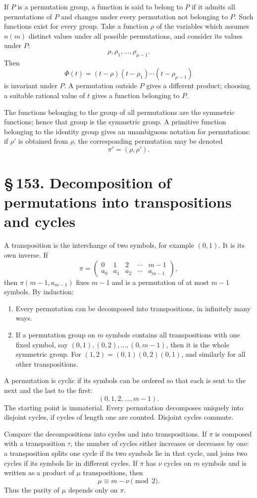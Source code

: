 \documentclass[11pt]{article}
\providecommand{\sect}[2]{\section*{\S\,#1. #2}}
\providecommand{\perm}[2]{\begin{pmatrix}#1\\#2\end{pmatrix}}
\begin{document}
If $P$ is a permutation group, a function is said to belong to $P$ if it admits all permutations of $P$ and changes under every permutation not belonging to $P$. Such functions exist for every group. Take a function $\rho$ of the variables which assumes $n(m)$ distinct values under all possible permutations, and consider its values under $P$:
\[
        \rho,
\rho_1,
\ldots,
\rho_{
\mu-1}.
\tag{1}
\]
Then
\[
        \Phi(t)=(t-\rho)(t-\rho_1)\cdots(t-\rho_{
\mu-1})
\tag{2}
\]
is invariant under $P$. A permutation outside $P$ gives a different product; choosing a suitable rational value of $t$ gives a function belonging to $P$.

The functions belonging to the group of all permutations are the symmetric functions; hence that group is the symmetric group. A primitive function belonging to the identity group gives an unambiguous notation for permutations: if $\rho'$ is obtained from $\rho$, the corresponding permutation may be denoted
\[
        \pi'=(\rho,\rho').
\]

\sect{153}{Decomposition of permutations into transpositions and cycles}

A transposition is the interchange of two symbols, for example $(0,1)$. It is its own inverse. If
\[
        \pi=\perm{0&1&2&\cdots&m-1}{a_0&a_1&a_2&\cdots&a_{m-1}},
\]
then $\pi(m-1,a_{m-1})$ fixes $m-1$ and is a permutation of at most $m-1$ symbols. By induction:

\begin{enumerate}[label=\arabic*.,leftmargin=2em]
\item Every permutation can be decomposed into transpositions, in infinitely many ways.
\item If a permutation group on $m$ symbols contains all transpositions with one fixed symbol, say $(0,1),(0,2),\ldots,(0,m-1)$, then it is the whole symmetric group. For $(1,2)=(0,1)(0,2)(0,1)$, and similarly for all other transpositions.
\end{enumerate}

A permutation is cyclic if its symbols can be ordered so that each is sent to the next and the last to the first:
\[
        (0,1,2,
\ldots,m-1).
\]
The starting point is immaterial. Every permutation decomposes uniquely into disjoint cycles, if cycles of length one are counted. Disjoint cycles commute.

Compare the decompositions into cycles and into transpositions. If $\pi$ is composed with a transposition $\tau$, the number of cycles either increases or decreases by one: a transposition splits one cycle if its two symbols lie in that cycle, and joins two cycles if its symbols lie in different cycles. If $\pi$ has $\nu$ cycles on $m$ symbols and is written as a product of $\mu$ transpositions, then
\[
        \mu\equiv m-\nu \pmod 2.
\]
Thus the parity of $\mu$ depends only on $\pi$.
\end{document}
